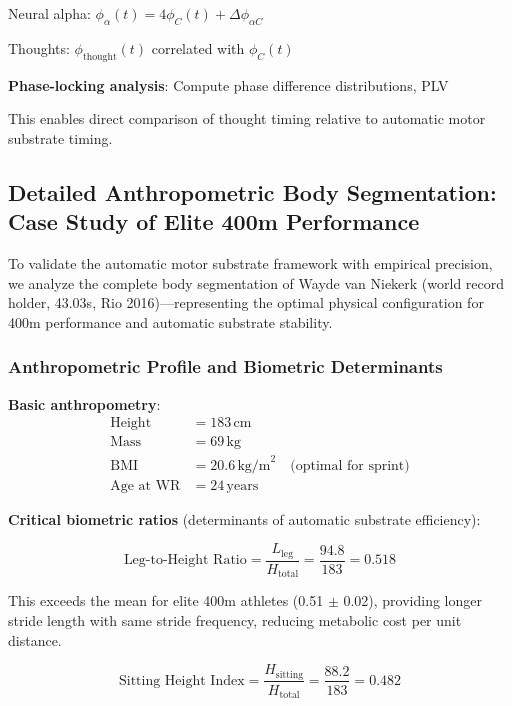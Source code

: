 \documentclass[11pt,onecolumn]{article}
\begin{document}
Neural alpha: $\phi_\alpha(t) = 4\phi_C(t) + \Delta\phi_{\alpha C}$

Thoughts: $\phi_{\text{thought}}(t)$ correlated with $\phi_C(t)$

\textbf{Phase-locking analysis}: Compute phase difference distributions, PLV

This enables direct comparison of thought timing relative to automatic motor substrate timing.

\subsection{Detailed Anthropometric Body Segmentation: Case Study of Elite 400m Performance}

To validate the automatic motor substrate framework with empirical precision, we analyze the complete body segmentation of Wayde van Niekerk (world record holder, 43.03s, Rio 2016)---representing the optimal physical configuration for 400m performance and automatic substrate stability.

\subsubsection{Anthropometric Profile and Biometric Determinants}

\textbf{Basic anthropometry}:
\begin{align}
\text{Height} &= 183\,\text{cm} \\
\text{Mass} &= 69\,\text{kg} \\
\text{BMI} &= 20.6\,\text{kg/m}^2 \quad \text{(optimal for sprint)} \\
\text{Age at WR} &= 24\,\text{years}
\end{align}

\textbf{Critical biometric ratios} (determinants of automatic substrate efficiency):

\begin{equation}
\text{Leg-to-Height Ratio} = \frac{L_{\text{leg}}}{H_{\text{total}}} = \frac{94.8}{183} = 0.518
\end{equation}

This exceeds the mean for elite 400m athletes (0.51 $\pm$ 0.02), providing longer stride length with same stride frequency, reducing metabolic cost per unit distance.

\begin{equation}
\text{Sitting Height Index} = \frac{H_{\text{sitting}}}{H_{\text{total}}} = \frac{88.2}{183} = 0.482
\end{equation}
\end{document}
